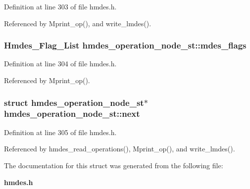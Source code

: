 Definition at line 303 of file hmdes.h.

Referenced by Mprint\_\-op(), and write\_\-lmdes().
\subsubsection{\setlength{\rightskip}{0pt plus 5cm}\bf{Hmdes\_\-Flag\_\-List} \bf{hmdes\_\-operation\_\-node\_\-st::mdes\_\-flags}}\label{structhmdes__operation__node__st_43aa083fb6062a5fe0d2de614b9aac4a}




Definition at line 304 of file hmdes.h.

Referenced by Mprint\_\-op().
\subsubsection{\setlength{\rightskip}{0pt plus 5cm}struct \bf{hmdes\_\-operation\_\-node\_\-st}$\ast$ \bf{hmdes\_\-operation\_\-node\_\-st::next}}\label{structhmdes__operation__node__st_139fdf5d7486dd4ae3da84dca69ee66a}




Definition at line 305 of file hmdes.h.

Referenced by hmdes\_\-read\_\-operations(), Mprint\_\-op(), and write\_\-lmdes().

The documentation for this struct was generated from the following file:\begin{CompactItemize}
\item 
\bf{hmdes.h}\end{CompactItemize}
